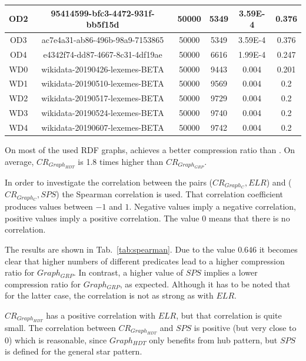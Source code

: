 \begin{center}
\begin{tabular}{|c|c|c|c|c|c|}
		\hline
		OD2 & 95414599-bfc3-4472-931f-bb5f15d & 50000 & 5349 & 3.59E-4 & 0.376 \\
		\hline
		OD3 & ac7e4a31-ab86-496b-98a9-7153865 & 50000 & 5349 & 3.59E-4 & 0.376 \\
		\hline
		OD4 & e4342f74-dd87-4667-8c31-4df19ae & 50000 & 6616 & 1.99E-4 & 0.247 \\
		\hline
		\hline
		WD0 & wikidata-20190426-lexemes-BETA & 50000 & 9443 & 0.004 & 0.201 \\
		\hline
		WD1 & wikidata-20190510-lexemes-BETA & 50000 & 9569 & 0.004 & 0.2 \\
		\hline
		WD2 & wikidata-20190517-lexemes-BETA & 50000 & 9729 & 0.004 & 0.2 \\
		\hline
		WD3 & wikidata-20190524-lexemes-BETA & 50000 & 9740 & 0.004 & 0.2 \\
		\hline
		WD4 & wikidata-20190607-lexemes-BETA & 50000 & 9742 & 0.004 & 0.2 \\
		\hline
	\end{tabular} 
	\label{tab:comparisonDatasets}
\end{center}

\FloatBarrier

On most of the used RDF graphs, \GGRP{} achieves a better compression ratio than \GHDT{}. On average, $CR_{Graph_{HDT}}$ is 1.8 times higher than $CR_{Graph_{GRP}}$.

In order to investigate the correlation between the pairs ($CR_{Graph_C},ELR$) and ($CR_{Graph_C},SPS$) the Spearman correlation is used. That correlation coefficient produces values between $ -1 $ and $ 1 $. Negative values imply a negative correlation, positive values imply a positive correlation. The value 0 means that there is no correlation.~\cite{spearman} 

The results are shown in Tab.~\ref{tab:spearman}. Due to the value $0.646$ it becomes clear that higher numbers of different predicates lead to a higher compression ratio for $Graph_{GRP}$. In contrast, a higher value of $SPS$ implies a lower compression ratio for $Graph_{GRP}$, as expected. Although it has to be noted that for the latter case, the correlation is not as strong as with $ELR$. 

$CR_{Graph_{HDT}}$ has a positive correlation with $ELR$, but that correlation is quite small. The correlation between $CR_{Graph_{HDT}}$ and $SPS$ is positive (but very close  to 0) which is reasonable, since $Graph_{HDT}$ only benefits from hub pattern, but $SPS$ is defined for the general star pattern.

